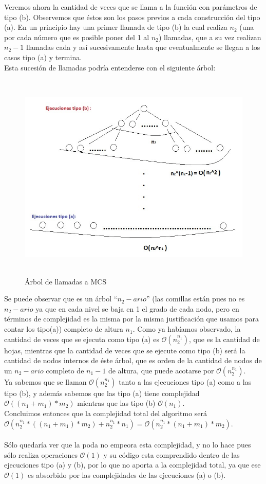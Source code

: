 Veremos ahora la cantidad de veces que se llama a la función con parámetros de tipo (b). Observemos que éstos son los pasos previos a cada construcción del tipo (a). En un principio hay una primer llamada de tipo (b) la cual realiza $n_2$ (una por cada número que es posible poner del 1 al $n_2$) llamadas, que a su vez realizan $n_2-1$ llamadas cada y así sucesivamente hasta que eventualmente se llegan a los casos tipo (a) y termina.\\
Esta sucesión de llamadas podría entenderse con el siguiente árbol:
    \begin{figure}[H]
      \includegraphics[height=10cm]{graficos/arbolesTipoAyB.jpg}
       \caption{Árbol de llamadas a MCS}
	\end{figure}
Se puede observar que es un árbol ``$n_2-ario$'' (las comillas están pues no es $n_2-ario$ ya que en cada nivel se baja en 1 el grado de cada nodo, pero en términos de complejidad es la misma por la misma justificación que usamos para contar los tipo(a)) completo de altura $n_1$. Como ya habíamos observado, la cantidad de veces que se ejecuta como tipo (a) es $\mathcal{O}(n_2^{n_1})$, que es la cantidad de hojas, mientras que la cantidad de veces que se ejecute como tipo (b) será la cantidad de nodos internos de éste árbol, que es orden de la cantidad de nodos de un $n_2-ario$ completo de $n_1 - 1$ de altura, que puede acotarse por $\mathcal{O}(n_2^{n_1})$.\\

Ya sabemos que se llaman $\mathcal{O}(n_2^{n_1})$ tanto a las ejecuciones tipo (a) como a las tipo (b), y además sabemos que las tipo (a) tiene complejidad $\mathcal{O}((n_1 + m_1)*m_2)$ mientras que las tipo (b) $\mathcal{O}(n_1)$. \\
Concluimos entonces que la complejidad total del algoritmo será $\mathcal{O}(n_2^{n_1}*((n_1 + m_1)*m_2)+n_2^{n_1}*n_1) = \mathcal{O}(n_2^{n_1}*(n_1 + m_1)*m_2) $.
\\ \\
Sólo quedaría ver que la poda no empeora esta complejidad, y no lo hace pues sólo realiza operaciones $\mathcal{O}(1)$ y su código esta comprendido dentro de las ejecuciones tipo (a) y (b), por lo que no aporta a la complejidad total, ya que ese $\mathcal{O}(1)$ es absorbido por las complejidades de las ejecuciones (a) o (b).
 
